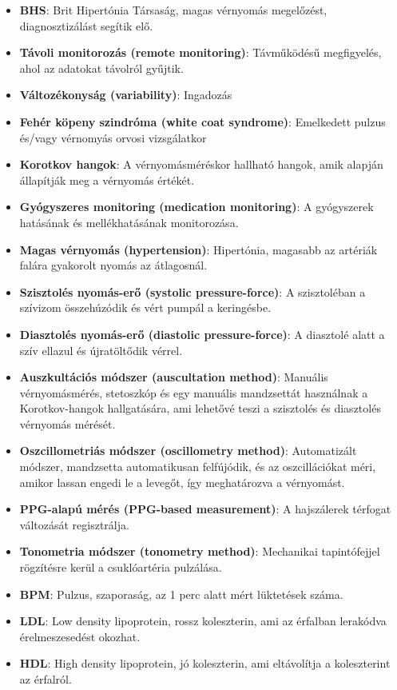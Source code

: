 \begin{itemize}
    \item \textbf{BHS}: Brit Hipertónia Társaság, magas vérnyomás megelőzést, diagnosztizálást segítik elő.
    \item \textbf{Távoli monitorozás (remote monitoring)}: Távműködésű megfigyelés, ahol az adatokat távolról gyűjtik.
    \item \textbf{Változékonyság (variability)}: Ingadozás
    \item \textbf{Fehér köpeny szindróma (white coat syndrome)}: Emelkedett pulzus és/vagy vérnomyás orvosi vizsgálatkor
    \item \textbf{Korotkov hangok}: A vérnyomásméréskor hallható hangok, amik alapján állapítják meg a vérnyomás értékét.
    \item \textbf{Gyógyszeres monitoring (medication monitoring)}: A gyógyszerek hatásának és mellékhatásának monitorozása.
    \item \textbf{Magas vérnyomás (hypertension)}: Hipertónia, magasabb az artériák falára gyakorolt nyomás az átlagosnál.
    \item \textbf{Szisztolés nyomás-erő (systolic pressure-force)}: A szisztoléban a szívizom összehúzódik és vért pumpál a keringésbe.
    \item \textbf{Diasztolés nyomás-erő (diastolic pressure-force)}: A diasztolé alatt a szív ellazul és újratöltődik vérrel.
    \item \textbf{Auszkultációs módszer (auscultation method)}: Manuális vérnyomásmérés, stetoszkóp és egy manuális mandzsettát használnak a Korotkov-hangok hallgatására, ami lehetővé teszi a szisztolés és diasztolés vérnyomás mérését.
    \item \textbf{Oszcillometriás módszer (oscillometry method)}: Automatizált módszer, mandzsetta automatikusan felfújódik, és az oszcillációkat méri, amikor lassan engedi le a levegőt, így meghatározva a vérnyomást.
    \item \textbf{PPG-alapú mérés (PPG-based measurement)}: A hajszálerek térfogat változását regisztrálja.
    \item \textbf{Tonometria módszer (tonometry method)}: Mechanikai tapintófejjel rögzítésre kerül a csuklóartéria pulzálása.
    \item \textbf{BPM}: Pulzus, szaporaság, az 1 perc alatt mért lüktetések száma.
    \item \textbf{LDL}: Low density lipoprotein, rossz koleszterin, ami az érfalban lerakódva érelmeszesedést okozhat.
    \item \textbf{HDL}: High density lipoprotein, jó koleszterin, ami eltávolítja a koleszterint az érfalról.

\end{itemize}
